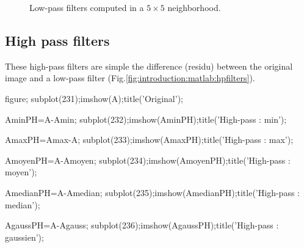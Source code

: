 \begin{figure}[htbp]
 \hspace{1cm}

 \caption{Low-pass filters computed in a $5\times 5$ neighborhood.}
 \label{fig:introduction:matlab:lpfilters}
\end{figure}

\newpage
\subsection{High pass filters}
These high-pass filters are simple the difference (residu) between the original image and a low-pass filter (Fig.\ref{fig:introduction:matlab:hpfilters}).

\begin{matlab}
figure;
subplot(231);imshow(A);title('Original');

AminPH=A-Amin;
subplot(232);imshow(AminPH);title('High-pass : min');

AmaxPH=Amax-A;
subplot(233);imshow(AmaxPH);title('High-pass : max');

AmoyenPH=A-Amoyen;
subplot(234);imshow(AmoyenPH);title('High-pass : moyen');

AmedianPH=A-Amedian;
subplot(235);imshow(AmedianPH);title('High-pass : median');

AgaussPH=A-Agauss;
subplot(236);imshow(AgaussPH);title('High-pass : gaussien');
\end{matlab}

